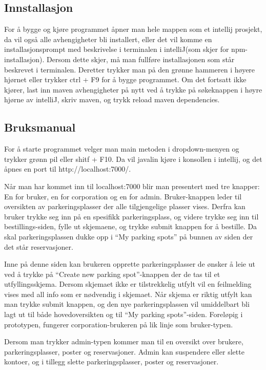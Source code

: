 \documentclass[12pt]{article}
\begin{document}
    \subsection{Innstallasjon}
    For å bygge og kjøre programmet åpner man hele mappen som et intellij prosjekt, da vil også alle avhengigheter bli installert, eller det vil komme en installasjonsprompt med beskrivelse i terminalen i  intelliJ(som skjer for npm-installasjon). Dersom dette skjer, må man fullføre installasjonen som står beskrevet i terminalen. Deretter trykker man på den grønne hammeren i høyere hjørnet eller trykker ctrl + F9 for å bygge programmet. Om det fortsatt ikke kjører, last inn maven avhengigheter på nytt ved å trykke på søkeknappen i høyre hjørne av intelliJ, skriv maven, og trykk reload maven dependencies.

    \subsection{Bruksmanual}
    For å starte programmet velger man main metoden i dropdown-menyen og trykker grønn pil eller shitf + F10. Da vil javalin kjøre i konsollen i intellij, og det åpnes en port til http://localhost:7000/.
    
    Når man har kommet inn til localhost:7000 blir man presentert med tre knapper: En for bruker, en for corporation og en for admin. Bruker-knappen leder til oversikten av parkeringsplasser der alle tilgjengelige plasser vises. Derfra kan bruker trykke seg inn på en spesifikk parkeringsplass, og videre trykke seg inn til bestillings-siden, fylle ut skjemaene, og trykke submit knappen for å bestille. Da skal parkeringsplassen dukke opp i “My parking spots” på bunnen av siden der det står reservasjoner.
    
    Inne på denne siden kan brukeren opprette parkeringsplasser de ønsker å leie ut ved å trykke på “Create new parking spot”-knappen der de tas til et utfyllingsskjema. Dersom skjemaet ikke er tilstrekkelig utfylt vil en feilmelding vises med all info som er nødvendig i skjemaet. Når skjema er riktig utfylt kan man trykke submit knappen, og den nye parkeringsplassen vil umiddelbart bli lagt ut til både hovedoversikten og til “My parking spots”-siden. Foreløpig i prototypen, fungerer corporation-brukeren på lik linje som bruker-typen.
    
    Dersom man trykker admin-typen kommer man til en oversikt over brukere, parkeringsplasser, poster og reservasjoner. Admin kan suspendere eller slette kontoer, og i tillegg slette parkeringsplasser, poster og reservasjoner.
\end{document}
